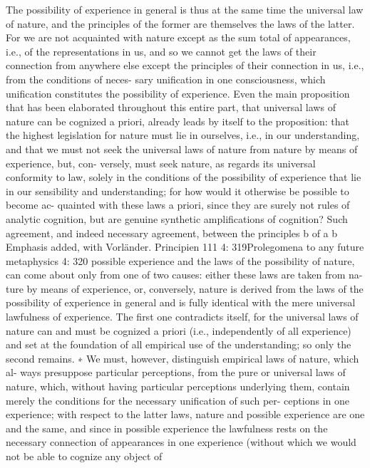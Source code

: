 The possibility of experience in general is thus at the same time the
universal law of nature, and the principles of the former are themselves
the laws of the latter. For we are not acquainted with nature except as
the sum total of appearances, i.e., of the representations in us, and so we
cannot get the laws of their connection from anywhere else except the
principles of their connection in us, i.e., from the conditions of neces-
sary uniﬁcation in one consciousness, which uniﬁcation constitutes the
possibility of experience.
Even the main proposition that has been elaborated throughout this
entire part, that universal laws of nature can be cognized a priori, already
leads by itself to the proposition: that the highest legislation for nature
must lie in ourselves, i.e., in our understanding, and that we must not seek
the universal laws of nature from nature by means of experience, but, con-
versely, must seek nature, as regards its universal conformity to law, solely
in the conditions of the possibility of experience that lie in our sensibility
and understanding; for how would it otherwise be possible to become ac-
quainted with these laws a priori, since they are surely not rules of analytic
cognition, but are genuine synthetic ampliﬁcations of cognition? Such
agreement, and indeed necessary agreement, between the principles b of
a
b
Emphasis added, with Vorländer.
Principien
111
4: 319Prolegomena to any future metaphysics
4: 320
possible experience and the laws of the possibility of nature, can come
about only from one of two causes: either these laws are taken from na-
ture by means of experience, or, conversely, nature is derived from the
laws of the possibility of experience in general and is fully identical with
the mere universal lawfulness of experience. The ﬁrst one contradicts
itself, for the universal laws of nature can and must be cognized a priori
(i.e., independently of all experience) and set at the foundation of all
empirical use of the understanding; so only the second remains. ∗
We must, however, distinguish empirical laws of nature, which al-
ways presuppose particular perceptions, from the pure or universal laws
of nature, which, without having particular perceptions underlying them,
contain merely the conditions for the necessary uniﬁcation of such per-
ceptions in one experience; with respect to the latter laws, nature and
possible experience are one and the same, and since in possible experience
the lawfulness rests on the necessary connection of appearances in one
experience (without which we would not be able to cognize any object of
